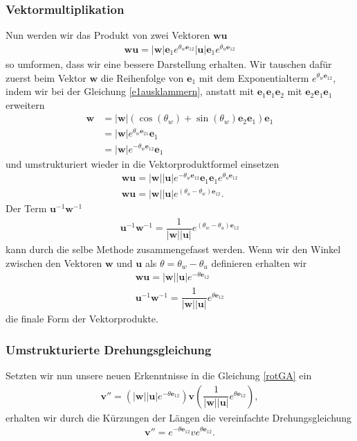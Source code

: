 \subsubsection{Vektormultiplikation}
Nun werden wir das Produkt von zwei Vektoren $\mathbf{wu}$
\begin{align}
	\mathbf{wu} = |\mathbf{w}|\mathbf{e}_1 e^{\theta_w \mathbf{e}_{12}}|\mathbf{u}|\mathbf{e}_1 e^{\theta_u \mathbf{e}_{12}}
\end{align}
so umformen, dass wir eine bessere Darstellung erhalten. Wir tauschen dafür zuerst beim Vektor $\mathbf{w}$ die Reihenfolge von 
$\mathbf{e}_1$ mit dem Exponentialterm $e^{\theta_w \mathbf{e}_{12}}$, indem wir bei der Gleichung \eqref{e1ausklammern}, anstatt mit $\mathbf{e}_1\mathbf{e}_1\mathbf{e}_2$ mit $\mathbf{e}_2\mathbf{e}_1\mathbf{e}_1$ erweitern
\begin{align} 
	\mathbf{w} &= |\mathbf{w}|\left(\cos(\theta_w)+ \sin(\theta_w) \mathbf{e}_2\mathbf{e}_1\right)\mathbf{e}_1\\
	&= |\mathbf{w}|e^{\theta_w \mathbf{e}_{21}}\mathbf{e}_1\\
	&= |\mathbf{w}|e^{-\theta_w \mathbf{e}_{12}}\mathbf{e}_1
\end{align}
und umstrukturiert wieder in die Vektorproduktformel einsetzen
\begin{align}
	\mathbf{wu} = |\mathbf{w}||\mathbf{u}|e^{-\theta_w \mathbf{e}_{12}}\mathbf{e}_1\mathbf{e}_1 e^{\theta_u \mathbf{e}_{12}}\\
	\mathbf{wu} = |\mathbf{w}||\mathbf{u}|e^{(\theta_u-\theta_w) \mathbf{e}_{12}}.
\end{align}
Der Term $\mathbf{u}^{-1}\mathbf{w}^{-1}$
\begin{align}
	\mathbf{u}^{-1}\mathbf{w}^{-1} = \dfrac{1}{|\mathbf{w}||\mathbf{u}|}e^{(\theta_w-\theta_u) \mathbf{e}_{12}}
\end{align}
kann durch die selbe Methode zusammengefasst werden.
Wenn wir den Winkel zwischen den Vektoren  $\mathbf{w}$ und $\mathbf{u}$ als $\theta = \theta_w - \theta_u$ definieren erhalten wir
\begin{align}\label{wuExpo}
	\mathbf{wu} = |\mathbf{w}||\mathbf{u}|e^{-\theta \mathbf{e}_{12}}\\
	\mathbf{u}^{-1}\mathbf{w}^{-1} = \dfrac{1}{|\mathbf{w}||\mathbf{u}|}e^{\theta \mathbf{e}_{12}} \label{wuExpoInv}
\end{align}
die finale Form der Vektorprodukte.
\subsubsection{Umstrukturierte Drehungsgleichung}
Setzten wir nun unsere neuen Erkenntnisse in die Gleichung \eqref{rotGA} ein
\begin{align}
	\mathbf{v''} = (|\mathbf{w}||\mathbf{u}|e^{-\theta \mathbf{e}_{12}}) \mathbf{v}( \dfrac{1}{|\mathbf{w}||\mathbf{u}|}e^{\theta \mathbf{e}_{12}}),
\end{align}
erhalten wir durch die Kürzungen der Längen die vereinfachte Drehungsgleichung
\begin{align}
	\mathbf{v''} = e^{-\theta \mathbf{e}_{12}} v e^{\theta \mathbf{e}_{12}}.
\end{align}

